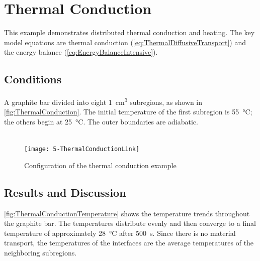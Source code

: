 \section{Thermal Conduction}
\label{sec:ThermalConduction}

This example demonstrates distributed thermal conduction and heating.  The key model equations are thermal conduction (\autoref{eq:ThermalDiffusiveTransport}) and the energy balance (\autoref{eq:EnergyBalanceIntensive}).

\subsection{Conditions}
\label{sec:ThermalConductionConditions}

A graphite bar divided into eight \SI{1}{cm^3} subregions, as shown in \autoref{fig:ThermalConduction}.  The initial temperature of the first subregion is \SI{55}{\celsius}; the others begin at \SI{25}{\celsius}.  The outer boundaries are adiabatic.

\begin{figure}[htbp]
  \vspace*{-1.72cm}\\\texttt{[image: 5-ThermalConductionLink]}\vspace*{-1cm}\\
  \caption{Configuration of the thermal conduction example}
  \label{fig:ThermalConduction}
\end{figure}

\subsection{Results and Discussion}



\autoref{fig:ThermalConductionTemperature} shows the temperature trends throughout the graphite bar.  The temperatures distribute evenly and then converge to a final temperature of approximately \SI{28}{\celsius} after \SI{500}{s}.  Since there is no material transport, the temperatures of the interfaces are the average temperatures of the neighboring subregions.  


